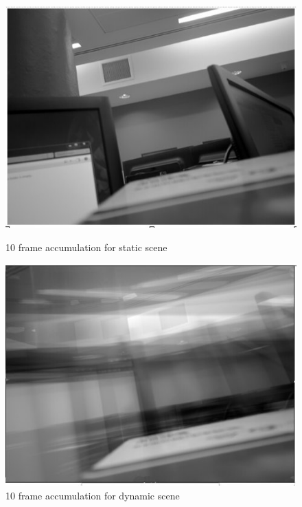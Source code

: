 {{\begin{figure}[H]
\begin{minipage}{0.4\textwidth}
\centering
\includegraphics[width=\textwidth]{../images/accumstatic}\caption{10 frame accumulation for static scene}\label{accumst}
\end{minipage}
\hspace{30pt}
\begin{minipage}{0.4\textwidth}
\centering
\includegraphics[width=\textwidth]{../images/accumdynamic}\caption{10 frame accumulation for dynamic scene}\label{accumdy}
\end{minipage}
\end{figure}

}}
